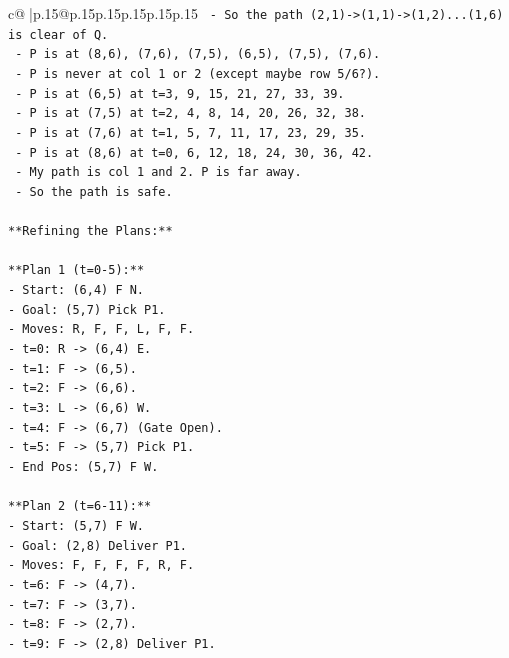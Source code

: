 \documentclass{article}
\begin{document}
{\begin{supertabular}{c@{$\;$}|p{.15\linewidth}@{}p{.15\linewidth}p{.15\linewidth}p{.15\linewidth}p{.15\linewidth}p{.15\linewidth}}
{{{\texttt{    {-} So the path (2,1){-}>(1,1){-}>(1,2)...(1,6) is clear of Q.} \\
\texttt{    {-} P is at (8,6), (7,6), (7,5), (6,5), (7,5), (7,6).} \\
\texttt{    {-} P is never at col 1 or 2 (except maybe row 5/6?).} \\
\texttt{    {-} P is at (6,5) at t=3, 9, 15, 21, 27, 33, 39.} \\
\texttt{    {-} P is at (7,5) at t=2, 4, 8, 14, 20, 26, 32, 38.} \\
\texttt{    {-} P is at (7,6) at t=1, 5, 7, 11, 17, 23, 29, 35.} \\
\texttt{    {-} P is at (8,6) at t=0, 6, 12, 18, 24, 30, 36, 42.} \\
\texttt{    {-} My path is col 1 and 2. P is far away.} \\
\texttt{    {-} So the path is safe.} \\
\\ 
\texttt{**Refining the Plans:**} \\
\\ 
\texttt{**Plan 1 (t=0{-}5):**} \\
\texttt{{-} Start: (6,4) F N.} \\
\texttt{{-} Goal: (5,7) Pick P1.} \\
\texttt{{-} Moves: R, F, F, L, F, F.} \\
\texttt{{-} t=0: R {-}> (6,4) E.} \\
\texttt{{-} t=1: F {-}> (6,5).} \\
\texttt{{-} t=2: F {-}> (6,6).} \\
\texttt{{-} t=3: L {-}> (6,6) W.} \\
\texttt{{-} t=4: F {-}> (6,7) (Gate Open).} \\
\texttt{{-} t=5: F {-}> (5,7) Pick P1.} \\
\texttt{{-} End Pos: (5,7) F W.} \\
\\ 
\texttt{**Plan 2 (t=6{-}11):**} \\
\texttt{{-} Start: (5,7) F W.} \\
\texttt{{-} Goal: (2,8) Deliver P1.} \\
\texttt{{-} Moves: F, F, F, F, R, F.} \\
\texttt{{-} t=6: F {-}> (4,7).} \\
\texttt{{-} t=7: F {-}> (3,7).} \\
\texttt{{-} t=8: F {-}> (2,7).} \\
\texttt{{-} t=9: F {-}> (2,8) Deliver P1.} \\
}}}
\end{supertabular}}
\end{document}
